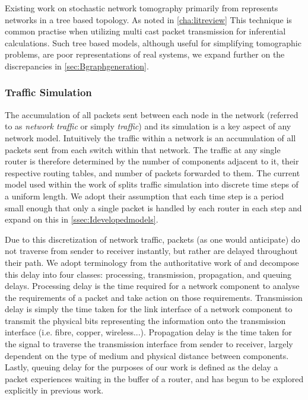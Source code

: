 Existing work on stochastic network tomography primarily from \cite{thoppe_stochastic_2014} \cite{kolar_distributed_2020} represents networks in a tree based topology. As noted in \cref{cha:litreview} This technique is common practise when utilizing multi cast packet transmission for inferential calculations. Such tree based models, although useful for simplifying tomographic problems, are poor representations of real systems, we expand further on the discrepancies in \cref{sec:Bgraphgeneration}.

\subsubsection*{Traffic Simulation}
\label{sssec:Itrafficsimulation}

The accumulation of all packets sent between each node in the network (referred to as \textit{network traffic} or simply \textit{traffic}) and its simulation is a key aspect of any network model. Intuitively the traffic within a network is an accumulation of all packets sent from each switch within that network. The traffic at any single router is therefore determined by the number of components adjacent to it, their respective routing tables, and number of packets forwarded to them. The current model used within the work of \cite{barnes_stochastic_2020} splits traffic simulation into discrete time steps of a uniform length. We adopt their assumption that each time step is a period small enough that only a single packet is handled by each router in each step and expand on this in \cref{ssec:Idevelopedmodels}. \par
Due to this discretization of network traffic, packets (as one would anticipate) do not traverse from sender to receiver instantly, but rather are delayed throughout their path. We adopt terminology from the authoritative work of \cite{kurose_computer_2013} and decompose this delay into four classes: processing, transmission, propagation, and queuing delays. Processing delay is the time required for a network component to analyse the requirements of a packet and take action on those requirements. Transmission delay is simply the time taken for the link interface of a network component to transmit the physical bits representing the information onto the transmission interface (i.e. fibre, copper, wireless...). Propagation delay is the time taken for the signal to traverse the transmission interface from sender to receiver, largely dependent on the type of medium and physical distance between components. Lastly, queuing delay for the purposes of our work is defined as the delay a packet experiences waiting in the buffer of a router, and has begun to be explored explicitly in previous work.\par
